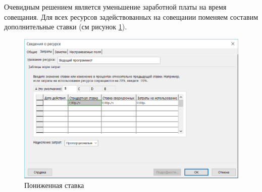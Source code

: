 Очевидным решением является уменьшение заработной платы на время совещания.
Для всех ресурсов задействованных на совещании поменяем составим дополнительные ставки (см рисунок \ref{fig:lab321}).

\begin{figure}[H]
	\centering
	\includegraphics[width=0.7\linewidth]{../../lab_03/report/src/lab3_2_1}
	\caption{Пониженная ставка}
	\label{fig:lab321}
\end{figure}


















